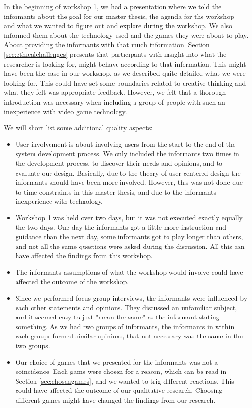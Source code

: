 In the beginning of workshop 1, we had a presentation where we told the informants about the goal for our master thesis, the agenda for the workshop, and what we wanted to figure out and explore during the workshop. We also informed them about the technology used and the games they were about to play. About providing the informants with that much information, Section \ref{sec:ethicalchallenges} presents that participants with insight into what the researcher is looking for, might behave according to that information. This might have been the case in our workshop, as we described quite detailed what we were looking for. This could have set some boundaries related to creative thinking and what they felt was appropriate feedback. However, we felt that a thorough introduction was necessary when including a group of people with such an inexperience with video game technology. 

We will short list some additional quality aspects: 
\begin{itemize}
\renewcommand{\labelitemi}{$\bullet$}
\item User involvement is about involving users from the start to the end of the system development process. We only included the informants two times in the development process, to discover their needs and opinions, and to evaluate our design. Basically, due to the theory of user centered design the informants should have been more involved. However, this was not done due to time constraints in this master thesis, and due to the informants inexperience with technology. 
\item Workshop 1 was held over two days, but it was not executed exactly equally the two days. One day the informants got a little more instruction and guidance than the next day, some informants got to play longer than others, and not all the same questions were asked during the discussion. All this can have affected the findings from this workshop. 
\item The informants assumptions of what the workshop would involve could have affected the outcome of the workshop. 
\item Since we performed focus group interviews, the informants were influenced by each other statements and opinions. They discussed an unfamiliar subject, and it seemed easy to just "mean the same" as the informant stating something. As we had two groups of informants, the informants in within each groups formed similar opinions, that not necessary was the same in the two groups.   
\item Our choice of games that we presented for the informants was not a coincidence. Each game were chosen for a reason, which can be read in Section \ref{sec:chosengames}, and we wanted to trig different reactions. This could have affected the outcome of our qualitative research. Choosing different games might have changed the findings from our research. 
\end{itemize}


